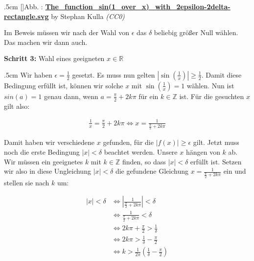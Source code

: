 \documentclass[fontsize=9pt,
               parskip=half-,
               DIV=14,
               listof=chapterentry,
               tocflat]{scrbook}
\newcounter{imagelabel}
\newenvironment{indentblock}{\begin{adjustwidth}{.5cm}{}}{\end{adjustwidth}}
\newcommand{\proofstep}[1]{\textbf{\textcolor{sblau}{#1}}}
\begin{document}
\begin{solutionprocess*}
\begin{indentblock}
[]{Abb. : \protect\href{https://commons.wikimedia.org/wiki/File:The_function_sin(1_over_x)_with_2epsilon-2delta-rectangle.svg}{\textbf{The\allowbreak\_function\allowbreak\_sin(1\allowbreak\_over\allowbreak\_x)\allowbreak\_with\allowbreak\_2epsilon\allowbreak-2delta\allowbreak-rectangle.svg}} by Stephan Kulla \textit{(CC0)}}\begin{center}
\end{center}

Im Beweis müssen wir nach der Wahl von $\epsilon $ das $\delta $ beliebig größer Null wählen. Das machen wir dann auch.

\end{indentblock}

\proofstep{Schritt 3:}
 Wahl eines geeigneten $x\in \mathbb {R} $\begin{indentblock}
Wir haben $\epsilon ={\tfrac {1}{2}}$ gesetzt. Es muss nun gelten $\left|\sin \left({\tfrac {1}{x}}\right)\right|\geq {\tfrac {1}{2}}$. Damit diese Bedingung erfüllt ist, können wir solche $x$ mit $\sin \left({\tfrac {1}{x}}\right)=1$ wählen. Nun ist $sin(a)=1$ genau dann, wenn $a={\tfrac {\pi }{2}}+2k\pi $ für ein $k\in \mathbb {Z} $ ist. Für die gesuchten $x$ gilt also:

\begin{align*}
{\frac {1}{x}}={\frac {\pi }{2}}+2k\pi \iff x={\frac {1}{{\frac {\pi }{2}}+2k\pi }}
\end{align*}

Damit haben wir verschiedene $x$ gefunden, für die $|f(x)|\geq \epsilon $ gilt. Jetzt muss noch die erste Bedingung $|x|<\delta $ beachtet werden. Unsere $x$ hängen von $k$ ab. Wir müssen ein geeignetes $k$ mit $k\in \mathbb {Z} $ finden, so dass $|x|<\delta $ erfüllt ist. Setzen wir also in diese Ungleichung $|x|<\delta $ die gefundene Gleichung $x={\tfrac {1}{{\tfrac {\pi }{2}}+2k\pi }}$ ein und stellen sie nach $k$ um:

\begin{align*}
\left|x\right|<\delta &\iff \left|{\frac {1}{{\frac {\pi }{2}}+2k\pi }}\right|<\delta \\[0.5em]&\iff {\frac {1}{{\frac {\pi }{2}}+2k\pi }}<\delta \\[0.5em]&\iff 2k\pi +{\frac {\pi }{2}}>{\frac {1}{\delta }}\\[0.5em]&\iff 2k\pi >{\frac {1}{\delta }}-{\frac {\pi }{2}}\\[0.5em]&\iff k>{\frac {1}{2\pi }}\left({\frac {1}{\delta }}-{\frac {\pi }{2}}\right)
\end{align*}


\end{indentblock}
\end{solutionprocess*}
\end{document}
